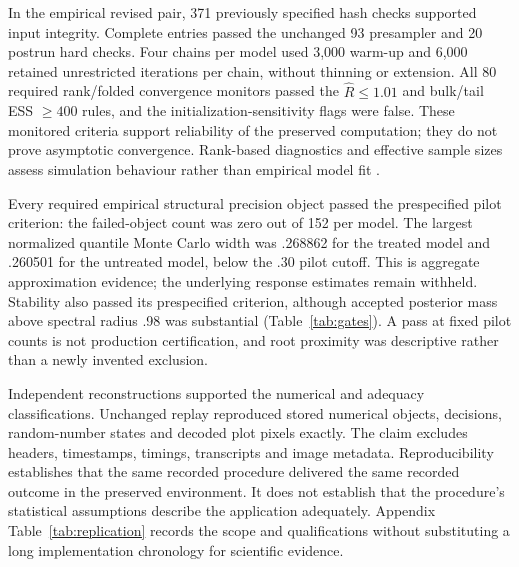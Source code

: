 \documentclass[11pt,a4paper]{article}
\begin{document}
In the empirical revised pair, 371 previously specified hash checks supported input integrity. Complete entries passed the unchanged 93 presampler and 20 postrun hard checks. Four chains per model used 3,000 warm-up and 6,000 retained unrestricted iterations per chain, without thinning or extension. All 80 required rank/folded convergence monitors passed the $\widehat R\le1.01$ and bulk/tail ESS $\ge400$ rules, and the initialization-sensitivity flags were false. These monitored criteria support reliability of the preserved computation; they do not prove asymptotic convergence. Rank-based diagnostics and effective sample sizes assess simulation behaviour rather than empirical model fit \cite{vehtari2021}.

Every required empirical structural precision object passed the prespecified pilot criterion: the failed-object count was zero out of 152 per model. The largest normalized quantile Monte Carlo width was .268862 for the treated model and .260501 for the untreated model, below the .30 pilot cutoff. This is aggregate approximation evidence; the underlying response estimates remain withheld. Stability also passed its prespecified criterion, although accepted posterior mass above spectral radius .98 was substantial (Table~\ref{tab:gates}). A pass at fixed pilot counts is not production certification, and root proximity was descriptive rather than a newly invented exclusion.

Independent reconstructions supported the numerical and adequacy classifications. Unchanged replay reproduced stored numerical objects, decisions, random-number states and decoded plot pixels exactly. The claim excludes headers, timestamps, timings, transcripts and image metadata. Reproducibility establishes that the same recorded procedure delivered the same recorded outcome in the preserved environment. It does not establish that the procedure's statistical assumptions describe the application adequately. Appendix Table~\ref{tab:replication} records the scope and qualifications without substituting a long implementation chronology for scientific evidence.
\end{document}
